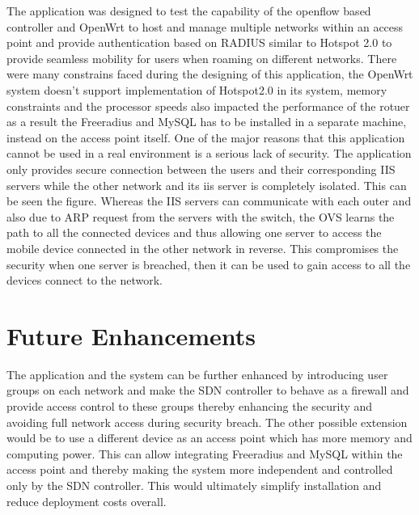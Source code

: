 The application was designed to test the capability of the openflow based controller and OpenWrt to host and manage multiple networks within an access point and provide authentication based on RADIUS similar to Hotspot 2.0 to provide seamless mobility for users when roaming on different networks. There were many constrains faced during the designing of this application, the OpenWrt system doesn’t support implementation of Hotspot2.0 in its system, memory constraints and the processor speeds also impacted the performance of the rotuer as a result the Freeradius and MySQL has to be installed in a separate machine, instead on the access point itself. One of the major reasons that this application cannot be used in a real environment is a serious lack of security. The application only provides secure connection between the users and their corresponding IIS servers while the other network and its iis server is completely isolated. This can be seen the figure. Whereas the IIS servers can communicate with each outer and also due to ARP request from the servers with the switch, the OVS learns the path to all the connected devices and thus allowing one server to access the mobile device connected in the other network in reverse. This compromises the security when one server is breached, then it can be used to gain access to all the devices connect to the network.

\section{Future Enhancements}
The application and the system can be further enhanced by introducing user groups on each network and make the SDN controller to behave as a firewall and provide access control to these groups thereby enhancing the security and avoiding full network access during security breach. The other possible extension would be to use a different device as an access point which has more memory and computing power. This can allow integrating Freeradius and MySQL within the access point and thereby making the system more independent and controlled only by the SDN controller. This would ultimately simplify installation and reduce deployment costs overall.